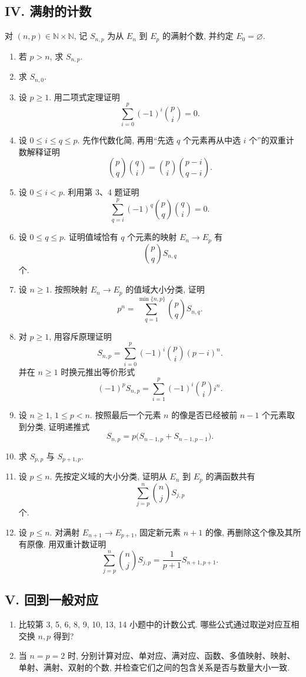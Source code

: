 \documentclass[usesamecnt, thmcnt=section, lang=cn, newtx, 10pt, scheme=chinese]{elegantbook}
\begin{document}
\subsection*{IV. 满射的计数}
对 $(n,p)\in\mathbb N\times\mathbb N$, 记 $S_{n,p}$ 为从 $E_n$ 到 $E_p$ 的满射个数, 并约定 $E_0=\varnothing$.
\begin{enumerate}[label=\textbf{\arabic*.}, resume=corr-count]
  \item 若 $p>n$, 求 $S_{n,p}$.
  \item 求 $S_{n,0}$.
  \item 设 $p\geq1$. 用二项式定理证明
  \[
   \sum_{i=0}^{p}(-1)^i\binom pi=0.
  \]
  \item 设 $0\leq i\leq q\leq p$. 先作代数化简, 再用``先选 $q$ 个元素再从中选 $i$ 个''的双重计数解释证明
  \[
   \binom pq\binom qi=\binom pi\binom{p-i}{q-i}.
  \]
  \item 设 $0\leq i<p$. 利用第 3、4 题证明
  \[
   \sum_{q=i}^{p}(-1)^q\binom pq\binom qi=0.
  \]
  \item 设 $0\leq q\leq p$. 证明值域恰有 $q$ 个元素的映射 $E_n\to E_p$ 有
  \[
   \binom pq S_{n,q}
  \]
  个.
  \item 设 $n\geq1$. 按照映射 $E_n\to E_p$ 的值域大小分类, 证明
  \[
   p^n=\sum_{q=1}^{\min\{n,p\}}\binom pqS_{n,q}.
  \]
  \item 对 $p\geq1$, 用容斥原理证明
  \[
   S_{n,p}
   =\sum_{i=0}^p(-1)^i\binom{p}{i}(p-i)^n.
  \]
  并在 $n\geq1$ 时换元推出等价形式
  \[
   (-1)^pS_{n,p}=\sum_{i=1}^{p}(-1)^i\binom pi i^n.
  \]
  \item 设 $n\geq1$, $1\leq p<n$. 按照最后一个元素 $n$ 的像是否已经被前 $n-1$ 个元素取到分类, 证明递推式
  \[
   S_{n,p}=p\bigl(S_{n-1,p}+S_{n-1,p-1}\bigr).
  \]
  \item 求 $S_{p,p}$ 与 $S_{p+1,p}$.
  \item 设 $p\leq n$. 先按定义域的大小分类, 证明从 $E_n$ 到 $E_p$ 的满函数共有
  \[
   \sum_{j=p}^{n}\binom njS_{j,p}
  \]
  个.
  \item 设 $p\leq n$. 对满射 $E_{n+1}\to E_{p+1}$, 固定新元素 $n+1$ 的像, 再删除这个像及其所有原像. 用双重计数证明
  \[
   \sum_{j=p}^{n}\binom njS_{j,p}
   =\frac{1}{p+1}S_{n+1,p+1}.
  \]
\end{enumerate}

\subsection*{V. 回到一般对应}
\begin{enumerate}[label=\textbf{\arabic*.}, resume=corr-count]
  \item 比较第 3, 5, 6, 8, 9, 10, 13, 14 小题中的计数公式. 哪些公式通过取逆对应互相交换 $n,p$ 得到?
  \item 当 $n=p=2$ 时, 分别计算对应、单对应、满对应、函数、多值映射、映射、单射、满射、双射的个数, 并检查它们之间的包含关系是否与数量大小一致.
\end{enumerate}
\end{document}
